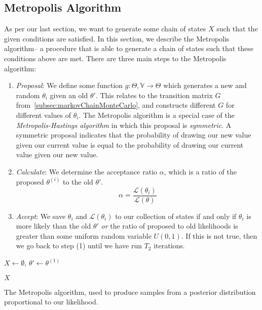 \subsection{Metropolis Algorithm}\label{subsec:metropolisAlgorithm}
As per our last section, we want to generate some chain of states $X$ such that the given conditions are satisfied.
In this section, we describe the Metropolis algorithm-- a procedure that is able to generate a chain of states such that
these conditions above are met.
There are three main steps to the Metropolis algorithm:
\begin{enumerate}
    \item \emph{Proposal}: We define some function $g : \Theta,\mathbb{V} \rightarrow \Theta$ which generates a
        new and random $\theta_i$ given an old $\theta'$.
        This relates to the transition matrix $G$ from~\autoref{subsec:markovChainMonteCarlo}, and constructs different
        $G$ for different values of $\theta_i$.
        The Metropolis algorithm is a special case of the \emph{Metropolis-Hastings algorithm} in which this proposal is
        \emph{symmetric}.
        A symmetric proposal indicates that the probability of drawing our new value given our current value is equal to
        the probability of drawing our current value given our new value.
    \item \emph{Calculate}: We determine the acceptance ratio $\alpha$, which is a ratio of the proposed $\theta^{(i)}$
        to the old $\theta'$.
    \begin{equation}
        \alpha = \frac{\mathcal{L}(\theta_i)}{\mathcal{L}(\theta)}
    \end{equation}
    \item \emph{Accept}: We save $\theta_i$ and $\mathcal{L}(\theta_i)$ to our collection of states if and only if
        $\theta_i$ is more likely than the old $\theta'$ \emph{or} the ratio of proposed to old likelihoods is greater
        than some uniform random variable $U(0, 1)$.
        If this is not true, then we go back to step (1) until we have run $T_2$ iterations.
\end{enumerate}

\begin{algorithm}[t]
    \SetAlgoLined
    \DontPrintSemicolon
     {
        $X \gets \emptyset$, $\theta' \gets \theta^{(1)}$ \;

        \Return $X$ \;
    }
    \caption{The Metropolis algorithm, used to produce samples from a posterior distribution proportional to our
    likelihood.}
    \label{alg:metropolis}
\end{algorithm}

